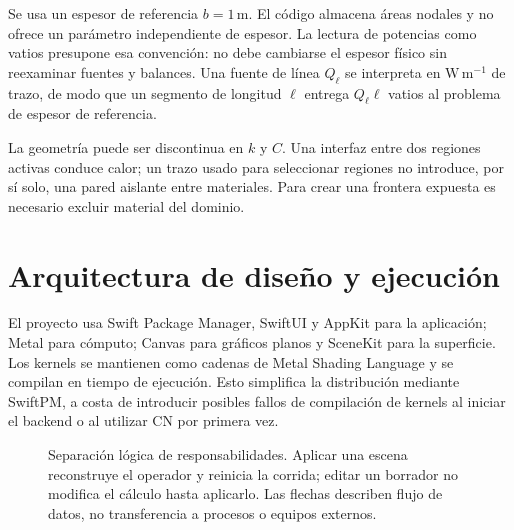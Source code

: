 \documentclass[11pt,a4paper]{article}
\newcommand{\code}[1]{\texttt{\detokenize{#1}}}
\begin{document}
Se usa un espesor de referencia $b=1\,\mathrm{m}$. El código almacena áreas
nodales y no ofrece un parámetro independiente de espesor. La lectura de
potencias como vatios presupone esa convención: no debe cambiarse el espesor
físico sin reexaminar fuentes y balances. Una fuente de línea $Q_\ell$ se
interpreta en $\mathrm{W\,m^{-1}}$ de trazo, de modo que un segmento de
longitud $\ell$ entrega $Q_\ell\ell$ vatios al problema de espesor de referencia.

La geometría puede ser discontinua en $k$ y $C$. Una interfaz entre dos
regiones activas conduce calor; un trazo usado para seleccionar regiones
no introduce, por sí solo, una pared aislante entre materiales. Para crear
una frontera expuesta es necesario excluir material del dominio.

\section{Arquitectura de diseño y ejecución}
\label{sec:architecture}
El proyecto usa Swift Package Manager, SwiftUI y AppKit para la aplicación;
Metal para cómputo; Canvas para gráficos planos y SceneKit para la superficie.
Los kernels se mantienen como cadenas de Metal Shading Language y se compilan
en tiempo de ejecución. Esto simplifica la distribución mediante SwiftPM,
a costa de introducir posibles fallos de compilación de kernels al iniciar
el backend o al utilizar CN por primera vez.

\begin{figure}[htbp]
\centering
{}
\caption{Separación lógica de responsabilidades. Aplicar una escena reconstruye
el operador y reinicia la corrida; editar un borrador no modifica el cálculo
hasta aplicarlo. Las flechas describen flujo de datos, no transferencia a
procesos o equipos externos.}
\label{fig:architecture}
\end{figure}
\end{document}
